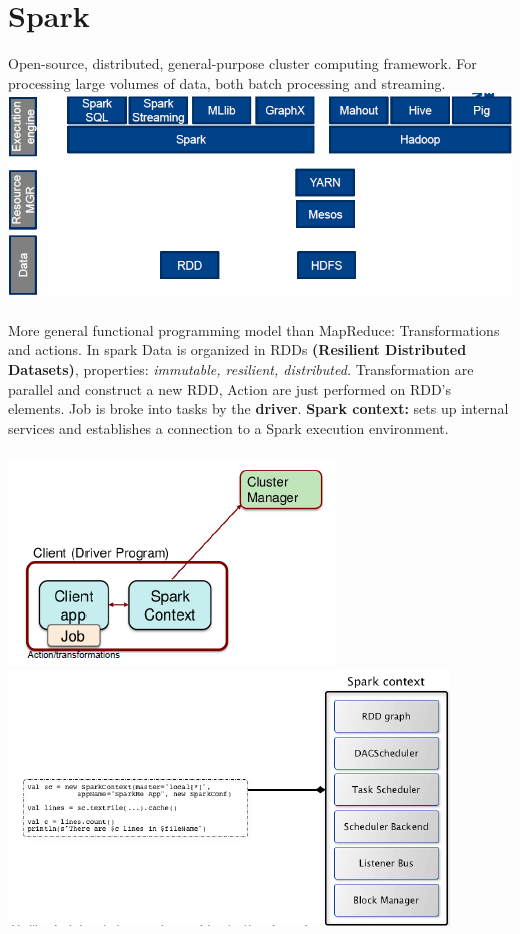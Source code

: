 \documentclass{article}
\begin{document}
\section{Spark}
Open-source, distributed, general-purpose cluster computing framework. For processing large volumes of data, both batch processing and streaming. \\
\includegraphics[scale=0.6]{41.png}\\\\
More general functional programming model than MapReduce: Transformations and actions. In spark Data is organized in RDDs \textbf{(Resilient Distributed Datasets)}, properties: \textit{immutable, resilient, distributed.} Transformation are parallel and construct a new RDD, Action are just performed on RDD's elements. Job is broke into tasks by the \textbf{driver}. \textbf{Spark context:} sets up internal services and establishes a connection to a Spark execution environment.\\\\
\includegraphics[scale=0.6]{42.png}
\includegraphics[scale=0.6]{43.png}\\\\
\end{document}
